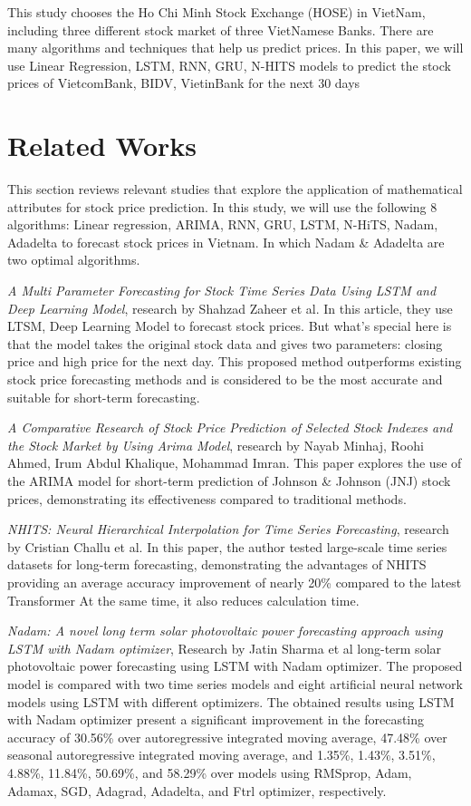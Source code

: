 \documentclass{ieeeojies}
\begin{document}
This study chooses the Ho Chi Minh Stock Exchange (HOSE) in VietNam, including three different stock market of three VietNamese Banks. There are many algorithms and techniques that help us predict prices. In this paper, we will use Linear Regression, LSTM, RNN, GRU, N-HITS models to predict the stock prices of VietcomBank, BIDV, VietinBank for the next 30 days \\

\section{Related Works}
This section reviews relevant studies that explore the application of mathematical attributes for stock price prediction. In this study, we will use the following 8 algorithms: Linear regression, ARIMA, RNN, GRU, LSTM, N-HiTS, Nadam, Adadelta to forecast stock prices in Vietnam. In which Nadam \& Adadelta are two optimal algorithms.

\textit{A Multi Parameter Forecasting for Stock Time Series Data Using LSTM and Deep Learning Model}, research by Shahzad Zaheer et al. In this article, they use LTSM, Deep Learning Model to forecast stock prices. But what's special here is that the model takes the original stock data and gives two parameters: closing price and high price for the next day. This proposed method outperforms existing stock price forecasting methods and is considered to be the most accurate and suitable for short-term forecasting. \cite{b2} 

\textit{A Comparative Research of Stock Price Prediction of Selected Stock Indexes and the Stock Market by Using Arima Model}, research by Nayab Minhaj, Roohi Ahmed, Irum Abdul Khalique, Mohammad Imran. This paper explores the use of the ARIMA model for short-term prediction of Johnson \& Johnson (JNJ) stock prices, demonstrating its effectiveness compared to traditional methods. \cite{b3} 

\textit{NHITS: Neural Hierarchical Interpolation for Time Series Forecasting}, research by Cristian Challu et al. In this paper, the author tested large-scale time series datasets for long-term forecasting, demonstrating the advantages of NHITS providing an average accuracy improvement of nearly 20\% compared to the latest Transformer At the same time, it also reduces calculation time. \cite{b4} 

\textit{Nadam: A novel long term solar photovoltaic power forecasting approach using LSTM with Nadam optimizer}, Research by Jatin Sharma et al long-term solar photovoltaic power forecasting using LSTM with Nadam optimizer. The proposed model is compared with two time series models and eight artificial neural network models using LSTM with different optimizers. The obtained results using LSTM with Nadam optimizer present a significant improvement in the forecasting accuracy of 30.56\% over autoregressive integrated moving average, 47.48\% over seasonal autoregressive integrated moving average, and 1.35\%, 1.43\%, 3.51\%, 4.88\%, 11.84\%, 50.69\%, and 58.29\% over models using RMSprop, Adam, Adamax, SGD, Adagrad, Adadelta, and Ftrl optimizer, respectively. \cite{b5} 
\end{document}
